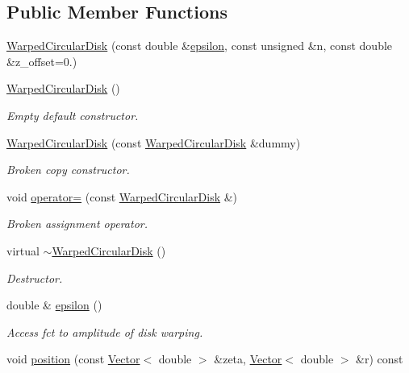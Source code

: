 \subsection*{Public Member Functions}
\begin{DoxyCompactItemize}
\item 
\hyperlink{classoomph_1_1WarpedCircularDisk_a6dd95f7f2c2240022ae3b1278108e379}{Warped\+Circular\+Disk} (const double \&\hyperlink{classoomph_1_1WarpedCircularDisk_a275692443cbe30be492c6ef33040b0be}{epsilon}, const unsigned \&n, const double \&z\+\_\+offset=0.)
\item 
\hyperlink{classoomph_1_1WarpedCircularDisk_a6715e7330692a145513fe6c04cf57773}{Warped\+Circular\+Disk} ()
\begin{DoxyCompactList}\small\item\em Empty default constructor. \end{DoxyCompactList}\item 
\hyperlink{classoomph_1_1WarpedCircularDisk_af7db1deb57f0f21ee5264a6590ccd5ee}{Warped\+Circular\+Disk} (const \hyperlink{classoomph_1_1WarpedCircularDisk}{Warped\+Circular\+Disk} \&dummy)
\begin{DoxyCompactList}\small\item\em Broken copy constructor. \end{DoxyCompactList}\item 
void \hyperlink{classoomph_1_1WarpedCircularDisk_a08535ed3d62242444ab367f20f455c5b}{operator=} (const \hyperlink{classoomph_1_1WarpedCircularDisk}{Warped\+Circular\+Disk} \&)
\begin{DoxyCompactList}\small\item\em Broken assignment operator. \end{DoxyCompactList}\item 
virtual \hyperlink{classoomph_1_1WarpedCircularDisk_ad56452d9635cd7ac0d09c547023d47ef}{$\sim$\+Warped\+Circular\+Disk} ()
\begin{DoxyCompactList}\small\item\em Destructor. \end{DoxyCompactList}\item 
double \& \hyperlink{classoomph_1_1WarpedCircularDisk_a275692443cbe30be492c6ef33040b0be}{epsilon} ()
\begin{DoxyCompactList}\small\item\em Access fct to amplitude of disk warping. \end{DoxyCompactList}\item 
void \hyperlink{classoomph_1_1WarpedCircularDisk_a270669e4e5424db18ad657f3876ed6bb}{position} (const \hyperlink{classoomph_1_1Vector}{Vector}$<$ double $>$ \&zeta, \hyperlink{classoomph_1_1Vector}{Vector}$<$ double $>$ \&r) const

\end{DoxyCompactItemize}
